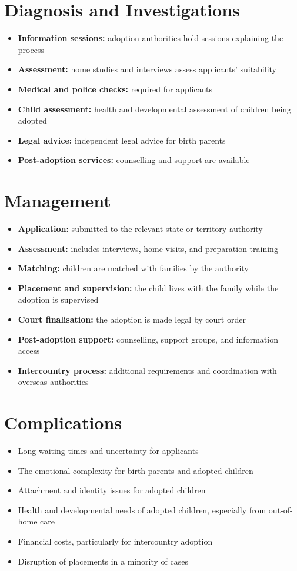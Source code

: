 \section*{Diagnosis and Investigations}
\begin{itemize}
    \item \textbf{Information sessions:} adoption authorities hold sessions explaining the process
    \item \textbf{Assessment:} home studies and interviews assess applicants' suitability
    \item \textbf{Medical and police checks:} required for applicants
    \item \textbf{Child assessment:} health and developmental assessment of children being adopted
    \item \textbf{Legal advice:} independent legal advice for birth parents
    \item \textbf{Post-adoption services:} counselling and support are available
\end{itemize}

\section*{Management}
\begin{itemize}
    \item \textbf{Application:} submitted to the relevant state or territory authority
    \item \textbf{Assessment:} includes interviews, home visits, and preparation training
    \item \textbf{Matching:} children are matched with families by the authority
    \item \textbf{Placement and supervision:} the child lives with the family while the adoption is supervised
    \item \textbf{Court finalisation:} the adoption is made legal by court order
    \item \textbf{Post-adoption support:} counselling, support groups, and information access
    \item \textbf{Intercountry process:} additional requirements and coordination with overseas authorities
\end{itemize}

\section*{Complications}
\begin{itemize}
    \item Long waiting times and uncertainty for applicants
    \item The emotional complexity for birth parents and adopted children
    \item Attachment and identity issues for adopted children
    \item Health and developmental needs of adopted children, especially from out-of-home care
    \item Financial costs, particularly for intercountry adoption
    \item Disruption of placements in a minority of cases
\end{itemize}

